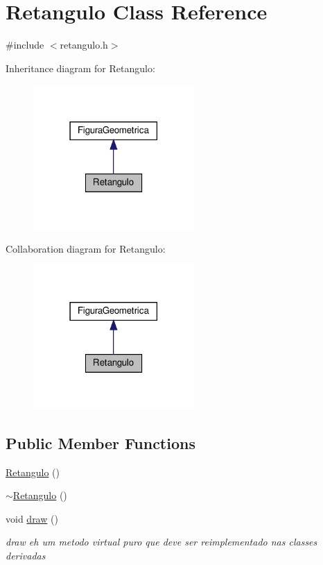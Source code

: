 \hypertarget{class_retangulo}{}\section{Retangulo Class Reference}
\label{class_retangulo}


{\ttfamily \#include $<$retangulo.\+h$>$}



Inheritance diagram for Retangulo\+:\nopagebreak
\begin{figure}[H]
\begin{center}
\leavevmode
\includegraphics[width=174pt]{class_retangulo__inherit__graph}
\end{center}
\end{figure}


Collaboration diagram for Retangulo\+:\nopagebreak
\begin{figure}[H]
\begin{center}
\leavevmode
\includegraphics[width=174pt]{class_retangulo__coll__graph}
\end{center}
\end{figure}
\subsection*{Public Member Functions}
\begin{DoxyCompactItemize}
\item 
\hyperlink{class_retangulo_ac21a81cae046920c8bee401bcb879562}{Retangulo} ()
\item 
\hyperlink{class_retangulo_a52b1a7f23e13a531a30526825b164615}{$\sim$\+Retangulo} ()
\item 
void \hyperlink{class_retangulo_a48cb75fe7cd048727879c25485976444}{draw} ()
\begin{DoxyCompactList}\small\item\em draw eh um metodo virtual puro que deve ser reimplementado nas classes derivadas \end{DoxyCompactList}\end{DoxyCompactItemize}


